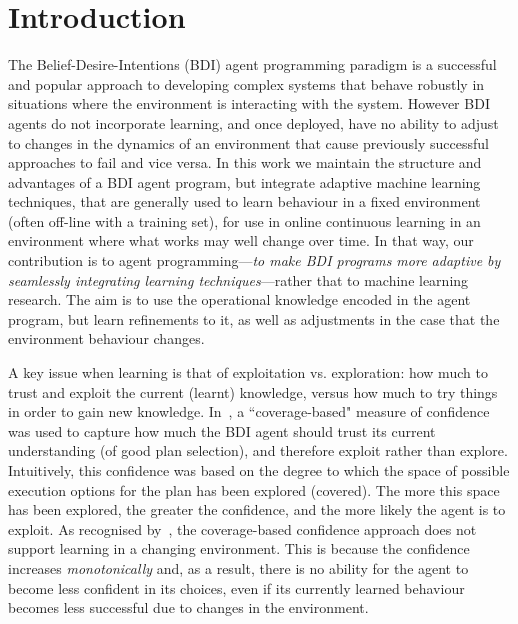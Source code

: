 \section{Introduction}\label{sec:introduction}


The Belief-Desire-Intentions (BDI) agent programming paradigm
\cite{WooldridgeBook,BusettaRHL:AL99-JACK,Pokahr:EXP03-JADEX,jasonbook} is a
successful and popular approach to developing complex systems that
behave robustly in situations where the environment is
interacting with the system.
However BDI agents do not incorporate learning, and once deployed,
have no ability to adjust to changes in the dynamics of an environment
that cause previously successful approaches to fail and vice versa.
In this work we maintain the structure and advantages of a BDI agent
program, but integrate adaptive machine
learning techniques, that are generally used to learn behaviour in a
fixed environment (often off-line with a training set),
for use in online continuous learning in an environment where what
works may well change over time.
In that way, our contribution is to agent programming---\emph{to make BDI programs more adaptive by seamlessly integrating learning techniques}---rather that to machine learning research.
The aim is to use the operational knowledge encoded in the
agent program, but learn refinements to it, as well as adjustments in the case that the environment behaviour changes. 


A key issue when learning is that of exploitation
vs. exploration: how much to trust and exploit the current
(learnt) knowledge, versus how much to try things in order to gain new
knowledge. 
In~\cite{singh10:extending,singh10:learning}, a
``coverage-based" measure of confidence was used to capture how much
the BDI agent should trust its current understanding (of good plan
selection), and therefore exploit rather than explore. Intuitively,
this confidence was based on the degree to which the space of possible
execution options for the plan has been explored (covered).
The more this space has been explored, the
greater the confidence, and the more likely the agent is
to exploit.   
%
As recognised by~\cite{singh10:learning}, the coverage-based
confidence approach does not support learning in a changing
environment. This is because the confidence increases
\emph{monotonically} and, as a result, there is no ability for the
agent to become less confident in its choices, even if its currently
learned behaviour becomes less successful due to changes in the
environment. 

